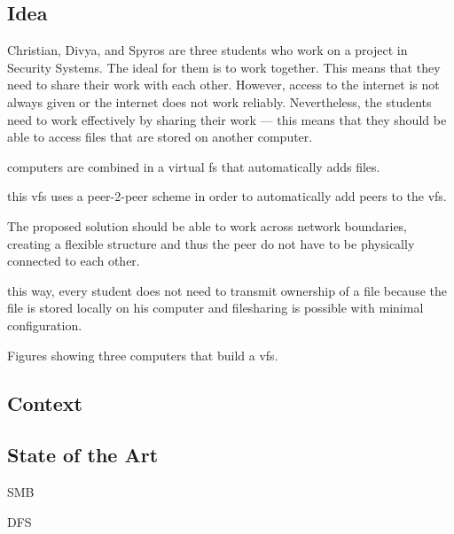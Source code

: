 
\subsection{Idea}

Christian, Divya, and Spyros are three students who work on a project in Security Systems. The ideal for them is to work together. This means that they need to share their work with each other. However, access to the internet is not always given or the internet does not work reliably. Nevertheless, the students need to work effectively by sharing their work --- this means that they should be able to access files that are stored on another computer.

computers are combined in a virtual fs that automatically adds files.

this vfs uses a peer-2-peer scheme in order to automatically add peers to the vfs. 

The proposed solution should be able to work across network boundaries, creating a flexible structure and thus the peer do not have to be physically connected to each other. 

this way, every student does not need to transmit ownership of a file because the file is stored locally on his computer and filesharing is possible with minimal configuration. 



Figures showing three computers that build a vfs.


\subsection{Context}

\subsection{State of the Art}

SMB

DFS